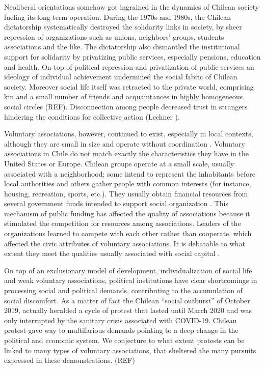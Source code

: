 Neoliberal orientations somehow got ingrained in the dynamics of Chilean society fueling its long term operation. During the 1970s and 1980s, the Chilean dictatorship systematically destroyed the solidarity links in society, by sheer repression of organizations such as unions, neighbors' groups, students associations and the like. The dictatorship also dismantled the institutional support for solidarity by privatizing public services, especially pensions, education and health. On top of political repression and privatization of public services an ideology of individual achievement undermined the social fabric of Chilean society. Moreover social life itself was retracted to the private world, comprising kin and a small number of friends and acquaintances in highly homogeneous social circles (REF). Disconnection among people decreased trust in strangers hindering the conditions for collective action (Lechner ). 
\bigskip

Voluntary associations, however, continued to exist, especially in local contexts, although they are small in size and operate without coordination \parencite{espinoza_local_2013}. Voluntary associations in Chile do not match exactly the characteristics they have in the United States or Europe. Chilean groups operate at a small scale, usually associated with a neighborhood; some intend to represent the inhabitants before local authorities and others gather people with common interests (for instance, housing, recreation, sports, etc.). They usually obtain financial resources from several government funds intended to support social organization \parencite{alenda__2013}. This mechanism of public funding has affected the quality of associations because it stimulated the competition for resources among associations. Leaders of the organizations learned to compete with each other rather than cooperate, which affected the civic attributes of voluntary associations. It is debatable to what extent they meet the qualities usually associated with social capital \parencite{delamaza_sociedad_2002, espinoza_local_2013}. 
\bigskip

On top of an exclusionary model of development, individualization of social life and weak voluntary associations, political institutions have clear shortcomings in processing social and political demands, contributing to the accumulation of social discomfort. As a matter of fact the Chilean “social outburst” of October 2019, actually heralded a cycle of protest that lasted until March 2020 and was only interrupted by the sanitary crisis associated with COVID-19. Chilean protest gave way to multifarious demands pointing to a deep change in the political and economic system. We conjecture to what extent protests can be linked to many types of voluntary associations, that sheltered the many pursuits expressed in these demonstrations. (REF)
 \bigskip
 
